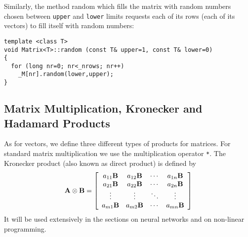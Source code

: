 Similarly, the method random which fills the matrix
with random numbers chosen between \verb+upper+ 
and \verb+lower+ limits requests each of its rows
(each of its vectors) to fill itself with random numbers:
{\footnotesize \begin{verbatim}
template <class T>
void Matrix<T>::random (const T& upper=1, const T& lower=0)
{
  for (long nr=0; nr<_nrows; nr++)
    _M[nr].random(lower,upper);
}
\end{verbatim}}


\subsection{Matrix Multiplication, Kronecker and Hadamard Products
                 \label{mat_products}}

As for vectors, we define three different types of products for
matrices. For standard matrix multiplication we use the multiplication
operator \verb+*+. The Kronecker product (also known as direct
product) is defined by
\begin{eqnarray}
{\bf A} \otimes {\bf B} = 
\left[ \begin{array}{cccc}
  a_{11} {\bf B} & a_{12} {\bf B} & \cdots & a_{1n} {\bf B} \\
  a_{21} {\bf B} & a_{22} {\bf B} & \cdots & a_{2n} {\bf B} \\
  \vdots & \vdots & \ddots & \vdots \\
  a_{m1} {\bf B} & a_{m2} {\bf B} & \cdots & a_{mn} {\bf B} \label{mat_kronprod}
\end{array} \right] 
 \end{eqnarray}
It will be used extensively in the sections on neural networks
and on non-linear programming. 

